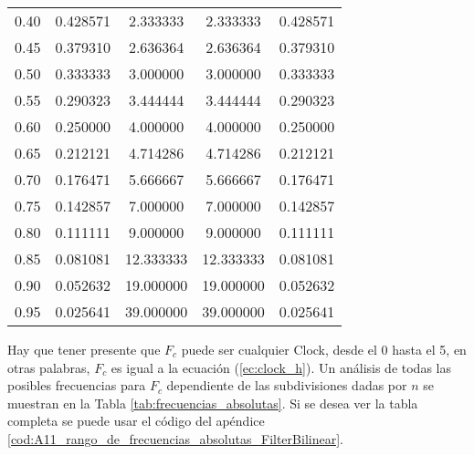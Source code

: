 \begin{table}[!hbp]
\begin{tabular}{ccccc}
			0.40 & 0.428571 & 2.333333 & 2.333333 & 0.428571 \\  
			                                            
			0.45 & 0.379310 & 2.636364 & 2.636364 & 0.379310 \\  
			                                             
			0.50 & 0.333333 & 3.000000 & 3.000000 & 0.333333 \\  
			                                             
			0.55 & 0.290323 & 3.444444 & 3.444444 & 0.290323 \\  
			                                             
			0.60 & 0.250000 & 4.000000 & 4.000000 & 0.250000 \\  
			                                              
			0.65 & 0.212121 & 4.714286 & 4.714286 & 0.212121 \\  
			                                             
			0.70 & 0.176471 & 5.666667 & 5.666667 & 0.176471 \\  
			                                              
			0.75 & 0.142857 & 7.000000 & 7.000000 & 0.142857 \\  
			                                              
			0.80 & 0.111111 & 9.000000 & 9.000000 & 0.111111 \\  
			                                             
			0.85 & 0.081081 & 12.333333 & 12.333333 & 0.081081 \\
			                                              
			0.90 & 0.052632 & 19.000000 & 19.000000 & 0.052632 \\
			                                              
			0.95 & 0.025641 & 39.000000 & 39.000000 & 0.025641 \\
			\hline                                              
			\end{tabular}                                                                
	\end{table} 
 
	Hay que tener presente que $F_{c}$ puede ser cualquier Clock, desde el 0 hasta el 5, en otras palabras, $F_{c}$ es igual a la ecuación (\ref{ec:clock_h}). Un análisis de todas las posibles frecuencias para $F_{c}$ dependiente de las subdivisiones dadas por $n$ se muestran en la Tabla \ref{tab:frecuencias_absolutas}. Si se desea ver la tabla completa se puede usar el código del apéndice \ref{cod:A11_rango_de_frecuencias_absolutas_FilterBilinear}. 

